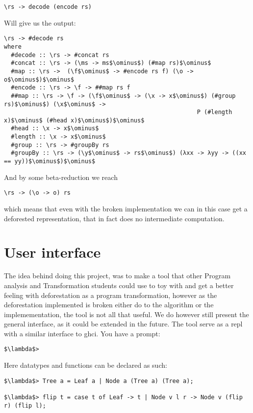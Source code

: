 \documentclass[a4paper, openany]{article}
\begin{document}
\begin{lstlisting}
\rs -> decode (encode rs)
\end{lstlisting}

Will give us the output:
\begin{lstlisting}[mathescape=true]
\rs -> #decode rs
where
  #decode :: \rs -> #concat rs
  #concat :: \rs -> (\ms -> ms$\ominus$) (#map rs)$\ominus$
  #map :: \rs ->  (\f$\ominus$ -> #encode rs f) (\o -> o$\ominus$)$\ominus$
  #encode :: \rs -> \f -> ##map rs f
  ##map :: \rs -> \f -> (\f$\ominus$ -> (\x -> x$\ominus$) (#group rs)$\ominus$) (\x$\ominus$ ->
                                                       P (#length x)$\ominus$ (#head x)$\ominus$)$\ominus$
  #head :: \x -> x$\ominus$
  #length :: \x -> x$\ominus$
  #group :: \rs -> #groupBy rs
  #groupBy :: \rs -> (\y$\ominus$ -> rs$\ominus$) (λxx -> λyy -> ((xx == yy))$\ominus$)$\ominus$
\end{lstlisting}

And by some beta-reduction we reach
\begin{lstlisting}[mathescape=true]
\rs -> (\o -> o) rs
\end{lstlisting}
which means that even with the broken implementation we can in this case get a deforested representation, that in fact does no intermediate computation.

\section{User interface}
\label{sec:tool}
The idea behind doing this project, was to make a tool that other Program analysis and Transformation students could use
to toy with and get a better feeling with deforestation as a program transformation, however as the deforestation implemented
is broken either do to the algorithm or the implemementation, the tool is not all that useful.
We do however still present the general interface, as it could be extended in the future.
The tool serve as a repl with a similar interface to ghci.
You have a prompt:
\begin{lstlisting}[mathescape=true]
$\lambda$>
\end{lstlisting}

Here datatypes and functions can be declared as such:
\begin{lstlisting}[mathescape=true]
$\lambda$> Tree a = Leaf a | Node a (Tree a) (Tree a);

$\lambda$> flip t = case t of Leaf -> t | Node v l r -> Node v (flip r) (flip l);
\end{lstlisting}
\end{document}

